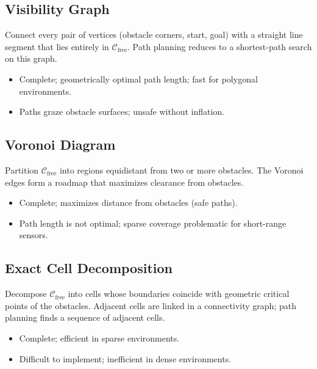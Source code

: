 \documentclass[11pt,a4paper]{article}
\theoremstyle{definition}
\theoremstyle{plain}
\theoremstyle{remark}
\begin{document}
\subsection{Visibility Graph}

Connect every pair of vertices (obstacle corners, start, goal) with a straight line segment that lies entirely in $\mathcal{C}_{\mathrm{free}}$. Path planning reduces to a shortest-path search on this graph.

\begin{itemize}
    \item[\textbf{+}] Complete; geometrically optimal path length; fast for polygonal environments.
    \item[\textbf{--}] Paths graze obstacle surfaces; unsafe without inflation.
\end{itemize}

\subsection{Voronoi Diagram}

Partition $\mathcal{C}_{\mathrm{free}}$ into regions equidistant from two or more obstacles. The Voronoi edges form a roadmap that maximizes clearance from obstacles.

\begin{itemize}
    \item[\textbf{+}] Complete; maximizes distance from obstacles (safe paths).
    \item[\textbf{--}] Path length is not optimal; sparse coverage problematic for short-range sensors.
\end{itemize}

\subsection{Exact Cell Decomposition}

Decompose $\mathcal{C}_{\mathrm{free}}$ into cells whose boundaries coincide with geometric critical points of the obstacles. Adjacent cells are linked in a connectivity graph; path planning finds a sequence of adjacent cells.

\begin{itemize}
    \item[\textbf{+}] Complete; efficient in sparse environments.
    \item[\textbf{--}] Difficult to implement; inefficient in dense environments.
\end{itemize}
\end{document}
